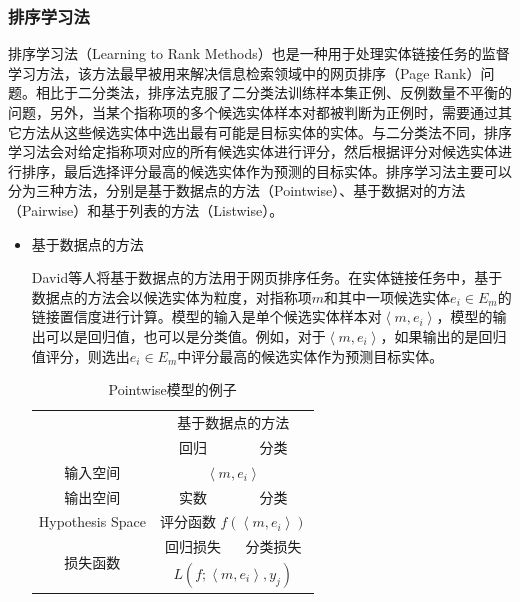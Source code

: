 \subsubsection{排序学习法}
排序学习法（Learning to Rank Methods）也是一种用于处理实体链接任务的监督学习方法，该方法最早被用来解决信息检索领域中的网页排序（Page Rank）问题。相比于二分类法，排序法克服了二分类法训练样本集正例、反例数量不平衡的问题，另外，当某个指称项的多个候选实体样本对都被判断为正例时，需要通过其它方法从这些候选实体中选出最有可能是目标实体的实体。与二分类法不同，排序学习法会对给定指称项对应的所有候选实体进行评分，然后根据评分对候选实体进行排序，最后选择评分最高的候选实体作为预测的目标实体。排序学习法主要可以分为三种方法，分别是基于数据点的方法（Pointwise）、基于数据对的方法（Pairwise）和基于列表的方法（Listwise）。

\begin{itemize}
	\item {基于数据点的方法
		
		David等人\cite{SRUR}将基于数据点的方法用于网页排序任务。在实体链接任务中，基于数据点的方法会以候选实体为粒度，对指称项$m$和其中一项候选实体$e_i\in E_m$的链接置信度进行计算。模型的输入是单个候选实体样本对$\left\langle m,e_i\right\rangle $，模型的输出可以是回归值，也可以是分类值。例如，对于$\left\langle m,e_i\right\rangle $，如果输出的是回归值评分，则选出$e_i\in E_m$中评分最高的候选实体作为预测目标实体。
		
		\begin{table}[!htb]
			\caption{Pointwise模型的例子\label{tab:piontwise}}
			\begin{center}
				\begin{tabular}{|c|c|c|}
					\hline
					\multirow{2}{*}{} & \multicolumn{2}{c|}{基于数据点的方法} \\ \cline{2-3}
					& 回归 & 分类 \\ \hline
					输入空间 & \multicolumn{2}{c|}{$\left\langle m,e_i\right\rangle $} \\ \hline
					输出空间 & 实数 & 分类 \\ \hline
					Hypothesis Space & \multicolumn{2}{c|}{评分函数 $f(\left\langle m,e_i\right\rangle)$} \\ \hline
					\multirow{2}{*}{损失函数} & 回归损失 & 分类损失 \\ \cline{2-3}
					& \multicolumn{2}{c|}{$L(f;\left\langle m,e_i\right\rangle,y_j)$} \\ \hline
				\end{tabular}
			\end{center}
		\end{table}
	
}
\end{itemize}

